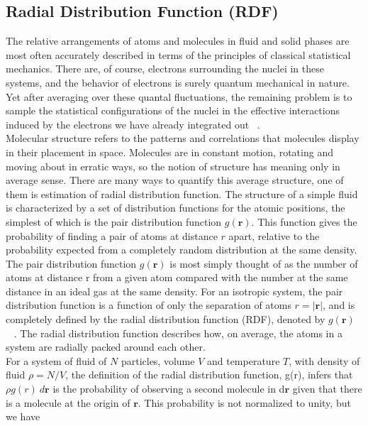 \subsection{Radial Distribution Function (RDF)}
\begin{sloppypar}
The relative arrangements of atoms and molecules in fluid and solid phases are most often accurately described in terms of the principles of classical statistical mechanics. There are, of course, electrons surrounding the nuclei in these systems, and the behavior of electrons is surely quantum mechanical in nature. Yet after averaging over these quantal fluctuations, the remaining problem is to sample the statistical configurations of the nuclei in the effective interactions induced by the electrons we have already integrated out~ \citep{chandler1987}.\\
Molecular structure refers to the patterns and correlations that molecules display in
their placement in space. Molecules are in constant motion, rotating and moving about in erratic ways, so the notion of structure has meaning only in average sense. There
are many ways to quantify this average structure, one of them is estimation  of radial distribution function. The structure of a simple fluid is characterized by a set of distribution functions for the atomic positions, the simplest of which is the pair distribution function $g(\mathbf{r})$. This function gives the probability of finding a pair of atoms at distance $r$ apart, relative to the probability expected from a completely random distribution at the same density. The pair distribution function $g(\mathbf{r})$ is most simply thought of as the  number of atoms at distance r from a given atom compared with the number at the same distance in an ideal gas at the same density. For an isotropic system, the pair distribution function is a function of only the separation of atoms $r = \lvert\mathbf{r}\rvert $, and is completely defined by the radial distribution function (RDF), denoted by $g(\mathbf{r})$ ~ \citep{Allen1989}. The radial distribution function describes how, on average, the atoms in a system are radially packed around each other.\\
For a system of fluid of  $N$ particles, volume $V$ and temperature $T$, with density of fluid $\rho = N/V$, the definition of the radial distribution function, g(r),
infers that $\rho g(r)~d\mathbf{r}$ is the probability of observing  a second molecule in d$\mathbf{r}$  given that there is a molecule at the origin of $\mathbf{r}$. This probability is not normalized to unity, but we have 

\end{sloppypar}
